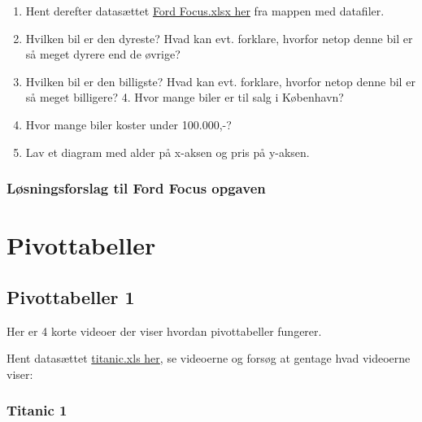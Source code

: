 \documentclass[
]{book}
\providecommand{\tightlist}{%
  \setlength{\itemsep}{0pt}\setlength{\parskip}{0pt}}
\begin{document}
\begin{enumerate}
\def\labelenumi{\arabic{enumi}.}
\tightlist
\item
  Hent derefter datasættet \href{./filer/FordFocus.xlsx}{Ford Focus.xlsx her} fra mappen med datafiler.\\
\item
  Hvilken bil er den dyreste? Hvad kan evt. forklare, hvorfor netop denne bil er så meget dyrere end de øvrige?\\
\item
  Hvilken bil er den billigste? Hvad kan evt. forklare, hvorfor netop denne bil er så meget billigere? 4. Hvor mange biler er til salg i København?\\
\item
  Hvor mange biler koster under 100.000,-?\\
\item
  Lav et diagram med alder på x-aksen og pris på y-aksen.
\end{enumerate}

\hypertarget{luxf8sningsforslag-til-ford-focus-opgaven}{%
\subsection{Løsningsforslag til Ford Focus opgaven}\label{luxf8sningsforslag-til-ford-focus-opgaven}}

\begin{embed-container}

\end{embed-container}

\hypertarget{pivottabeller}{%
\chapter{Pivottabeller}\label{pivottabeller}}

\hypertarget{pivottabeller-1}{%
\section{Pivottabeller 1}\label{pivottabeller-1}}

Her er 4 korte videoer der viser hvordan pivottabeller fungerer.

Hent datasættet \href{./filer/titanic.xls}{titanic.xls her}, se videoerne og forsøg at gentage hvad videoerne viser:

\hypertarget{titanic-1}{%
\subsection{Titanic 1}\label{titanic-1}}
\end{document}
